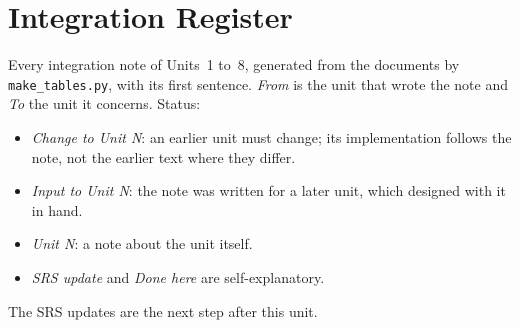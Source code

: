 \documentclass[11pt,a4paper]{article}
\begin{document}
\section{Integration Register}
\label{sec:register}
Every integration note of Units~1 to~8, generated from the documents by \texttt{make\_\allowbreak tables.\allowbreak py}, with its first sentence. \emph{From} is the unit that wrote the note and \emph{To} the unit it concerns. Status:
\begin{itemize}[nosep]
  \item \emph{Change to Unit N}: an earlier unit must change; its implementation follows the note, not the earlier text where they differ.
  \item \emph{Input to Unit N}: the note was written for a later unit, which designed with it in hand.
  \item \emph{Unit N}: a note about the unit itself.
  \item \emph{SRS update} and \emph{Done here} are self-explanatory.
\end{itemize}
The SRS updates are the next step after this unit.
\end{document}
